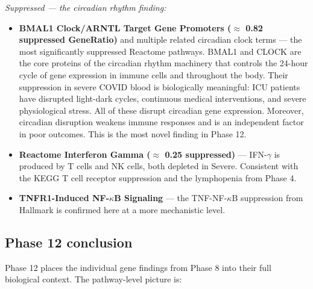 \documentclass[11pt, a4paper]{article}
\begin{document}
\textit{Suppressed — the circadian rhythm finding:}
\begin{itemize}[nosep]
  \item \textbf{BMAL1 Clock/ARNTL Target Gene Promoters ($\approx$ 0.82 suppressed
        GeneRatio)} and multiple related circadian clock terms — the most
        significantly suppressed Reactome pathways.
        BMAL1 and CLOCK are the core proteins of the circadian rhythm machinery that
        controls the 24-hour cycle of gene expression in immune cells and throughout
        the body. Their suppression in severe COVID blood is biologically meaningful:
        ICU patients have disrupted light-dark cycles, continuous medical interventions,
        and severe physiological stress. All of these disrupt circadian gene expression.
        Moreover, circadian disruption weakens immune responses and is an independent
        factor in poor outcomes. This is the most novel finding in Phase 12.
  \item \textbf{Reactome Interferon Gamma ($\approx$ 0.25 suppressed)} — IFN-$\gamma$
        is produced by T cells and NK cells, both depleted in Severe. Consistent with
        the KEGG T cell receptor suppression and the lymphopenia from Phase 4.
  \item \textbf{TNFR1-Induced NF-$\kappa$B Signaling} — the TNF-NF-$\kappa$B
        suppression from Hallmark is confirmed here at a more mechanistic level.
\end{itemize}

\subsection{Phase 12 conclusion}

Phase 12 places the individual gene findings from Phase 8 into their full
biological context. The pathway-level picture is:
\end{document}
